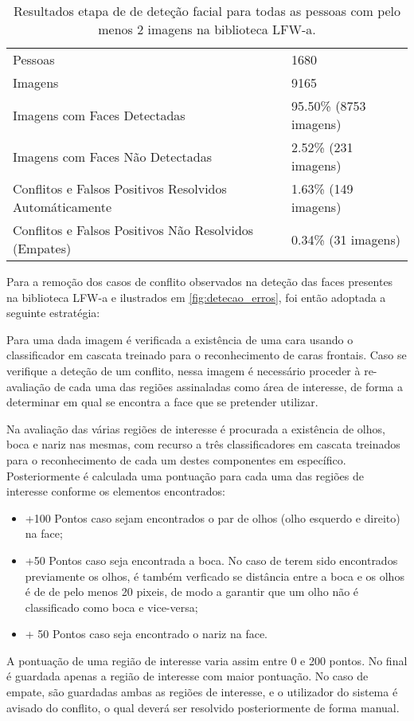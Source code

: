 \begin{table}
\caption{Resultados etapa de de deteção facial para todas as pessoas com pelo menos 2 imagens na biblioteca LFW-a.}
    \begin{tabular}{ll}
    \hline
    \hline
    Pessoas                                                 & 1680                   \\
    Imagens                                                 & 9165                   \\ \hline
    Imagens com Faces Detectadas                            & 95.50\% (8753 imagens) \\
    Imagens com Faces Não Detectadas                        & 2.52\% (231 imagens)   \\
    Conflitos e Falsos Positivos Resolvidos Automáticamente & 1.63\% (149 imagens)   \\
    Conflitos e Falsos Positivos Não Resolvidos (Empates)   & 0.34\% (31 imagens)    \\
    \hline
    \hline
    \end{tabular}
    \label{tab:desempenho_detecao}
\end{table}

Para a remoção dos casos de conflito observados na deteção das faces presentes na biblioteca LFW-a e ilustrados em \ref{fig:detecao_erros}, foi então adoptada a seguinte estratégia:

Para uma dada imagem é verificada a existência de uma cara usando o classificador em cascata treinado para o reconhecimento de caras frontais. Caso se verifique a deteção de um conflito, nessa imagem é necessário proceder à re-avaliação de cada uma das regiões assinaladas como área de interesse, de forma a determinar em qual se encontra a face que se pretender utilizar.

Na avaliação das várias regiões de interesse é procurada a existência de olhos, boca e nariz nas mesmas, com recurso a três classificadores em cascata treinados para o reconhecimento de cada um destes componentes em específico. Posteriormente é calculada uma pontuação para cada uma das regiões de interesse conforme os elementos encontrados:
\begin{itemize}
\item +100 Pontos caso sejam encontrados o par de olhos (olho esquerdo e direito) na face;
\item +50 Pontos caso seja encontrada a boca. No caso de terem sido encontrados previamente os olhos, é também verficado se distância entre a boca e os olhos é de de pelo menos 20 pixeis, de modo a garantir que um olho não é classificado como boca e vice-versa;
\item + 50 Pontos caso seja encontrado o nariz na face.
\end{itemize}
A pontuação de uma região de interesse varia assim entre 0 e 200 pontos. No final é guardada apenas a região de interesse com maior pontuação. No caso de empate, são guardadas ambas as regiões de interesse, e o utilizador do sistema é avisado do conflito, o qual deverá ser resolvido posteriormente de forma manual.

